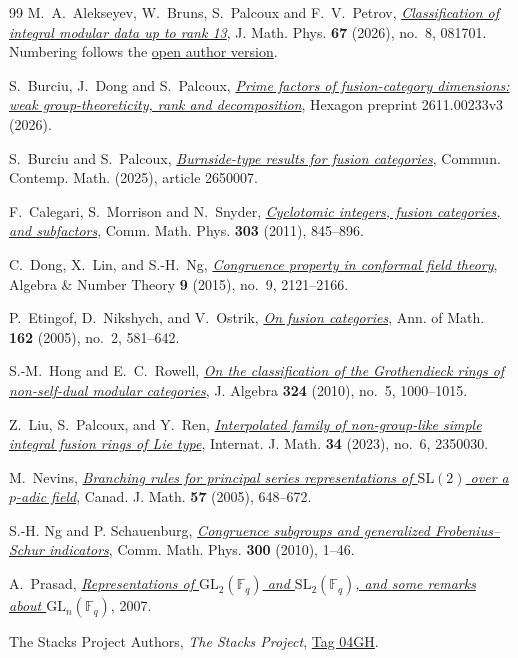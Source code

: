 \documentclass[11pt]{amsart}
\numberwithin{equation}{section}
\theoremstyle{definition}
\theoremstyle{plain}
\begin{document}
\begin{thebibliography}{99}
M.~A.~Alekseyev, W.~Bruns, S.~Palcoux and F.~V.~Petrov,
\href{https://doi.org/10.1063/5.0334158}{\emph{Classification of integral
modular data up to rank 13}}, J. Math. Phys. \textbf{67} (2026), no.~8, 081701. Numbering follows the \href{https://arxiv.org/abs/2302.01613v10}{open author version}.

S.~Burciu, J.~Dong and S.~Palcoux,
\href{https://hexagonmath.org/2611.00233v3}{\emph{Prime factors of fusion-category dimensions: weak group-theoreticity, rank and decomposition}},
Hexagon preprint 2611.00233v3 (2026).

S.~Burciu and S.~Palcoux,
\href{https://doi.org/10.1142/S0219199726500070}{\emph{Burnside-type
results for fusion categories}}, Commun. Contemp. Math. (2025), article 2650007.

F.~Calegari, S.~Morrison and N.~Snyder,
\href{https://doi.org/10.1007/s00220-010-1136-2}{\emph{Cyclotomic integers, fusion categories, and subfactors}},
Comm. Math. Phys. \textbf{303} (2011), 845--896.

C.~Dong, X.~Lin, and S.-H.~Ng,
\href{https://doi.org/10.2140/ant.2015.9.2121}{\emph{Congruence property in conformal field theory}},
Algebra \& Number Theory \textbf{9} (2015), no.~9, 2121--2166.

P.~Etingof, D.~Nikshych, and V.~Ostrik,
\href{https://doi.org/10.4007/annals.2005.162.581}{\emph{On fusion categories}},
Ann. of Math. \textbf{162} (2005), no.~2, 581--642.

S.-M.~Hong and E.~C.~Rowell,
\href{https://doi.org/10.1016/j.jalgebra.2009.11.044}{\emph{On the classification of the Grothendieck rings of non-self-dual modular categories}},
J. Algebra \textbf{324} (2010), no.~5, 1000--1015.

Z.~Liu, S.~Palcoux, and Y.~Ren,
\href{https://doi.org/10.1142/S0129167X23500301}{\emph{Interpolated family of non-group-like simple integral fusion rings of Lie type}},
Internat. J. Math. \textbf{34} (2023), no.~6, 2350030.

M.~Nevins, \href{https://doi.org/10.4153/CJM-2005-026-1}{\emph{Branching
rules for principal series representations of $\mathrm{SL}(2)$ over a
$p$-adic field}}, Canad. J. Math. \textbf{57} (2005), 648--672.

S.-H. Ng and P. Schauenburg, \href{https://doi.org/10.1007/s00220-010-1096-6}{\emph{Congruence subgroups and generalized Frobenius--Schur indicators}}, Comm. Math. Phys. \textbf{300} (2010), 1--46.

A.~Prasad, \href{https://arxiv.org/abs/0712.4051}{\emph{Representations
of $\mathrm{GL}_2(\mathbb F_q)$ and $\mathrm{SL}_2(\mathbb F_q)$, and
some remarks about $\mathrm{GL}_n(\mathbb F_q)$}}, 2007.

The Stacks Project Authors, \emph{The Stacks Project},
\href{https://stacks.math.columbia.edu/tag/04GH}{Tag 04GH}.
\end{thebibliography}
\end{document}
